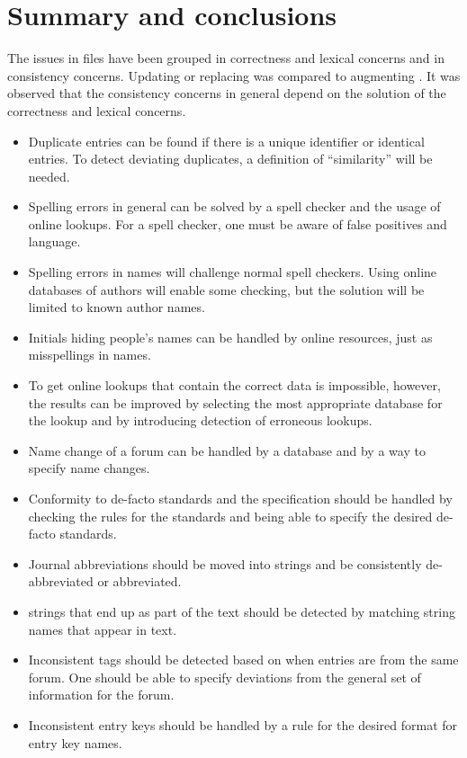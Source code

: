 \section{Summary and conclusions}

The issues in {\bibtex} files have been grouped in correctness and
lexical concerns and in consistency concerns.  Updating or replacing
{\bibtex} was compared to augmenting {\bibtex}.  It was observed that
the consistency concerns in general depend on the solution of the
correctness and lexical concerns.

\begin{itemize}
\item Duplicate entries can be found if there is a unique identifier
  or identical entries.  To detect deviating duplicates, a definition
  of ``similarity'' will be needed.

\item Spelling errors in general can be solved by a spell checker and
  the usage of online lookups.  For a spell checker, one must be aware
  of false positives and language.

\item Spelling errors in names will challenge normal spell checkers.
  Using online databases of authors will enable some checking, but the
  solution will be limited to known author names.

\item Initials hiding people's names can be handled by online
  resources, just as misspellings in names.

\item To get online lookups that contain the correct data is
  impossible, however, the results can be improved by selecting the
  most appropriate database for the lookup and by introducing
  detection of erroneous lookups.

\item Name change of a forum can be handled by a database and by a way
  to specify name changes.

\item Conformity to de-facto standards and the {\bibtex} specification
  should be handled by checking the rules for the standards and being
  able to specify the desired de-facto standards.

\item Journal abbreviations should be moved into strings and be
  consistently de-abbreviated or abbreviated.

\item {\bibtex} strings that end up as part of the text should be
  detected by matching string names that appear in text.

\item Inconsistent tags should be detected based on when entries are
  from the same forum.  One should be able to specify deviations from
  the general set of information for the forum.

\item Inconsistent entry keys should be handled by a rule for the
  desired format for entry key names.
\end{itemize}

